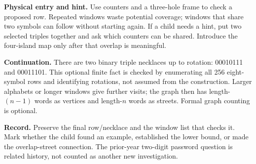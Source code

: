 \documentclass[11pt]{article}
\newcommand{\labelled}[2]{\textbf{#1} #2\par}
\begin{document}
\labelled{Physical entry and hint.}{Use counters and a three-hole frame to check a proposed row. Repeated windows waste potential coverage; windows that share two symbols can follow without starting again. If a child needs a hint, put two selected triples together and ask which counters can be shared. Introduce the four-island map only after that overlap is meaningful.}
\labelled{Continuation.}{There are two binary triple necklaces up to rotation: 00010111 and 00011101. This optional finite fact is checked by enumerating all 256 eight-symbol rows and identifying rotations, not assumed from the construction. Larger alphabets or longer windows give further visits; the graph then has length-$(n-1)$ words as vertices and length-$n$ words as streets. Formal graph counting is optional.}
\labelled{Record.}{Preserve the final row/necklace and the window list that checks it. Mark whether the child found an example, established the lower bound, or made the overlap-street connection. The prior-year two-digit password question is related history, not counted as another new investigation.}
\end{document}
